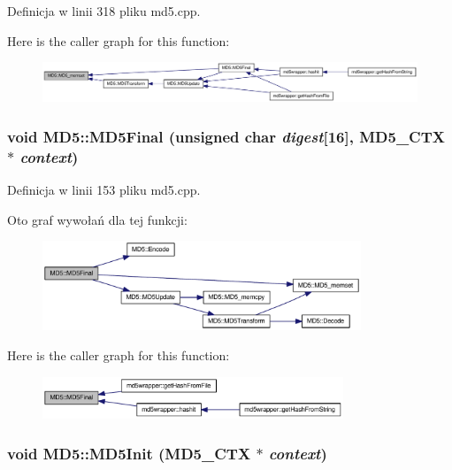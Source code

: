 Definicja w linii 318 pliku md5.cpp.

Here is the caller graph for this function:\nopagebreak
\begin{figure}[H]
\begin{center}
\leavevmode
\includegraphics[width=420pt]{d7/d46/a00002_e1a522aab83da49d1bd3f0a6f3edcd11_icgraph}
\end{center}
\end{figure}
\hypertarget{a00002_98039031d87c1f5b787050e2b487d83f}{
\subsubsection[{MD5Final}]{\setlength{\rightskip}{0pt plus 5cm}void MD5::MD5Final (unsigned char {\em digest}\mbox{[}16\mbox{]}, \/  {\bf MD5\_\-CTX} $\ast$ {\em context})}}
\label{d7/d46/a00002_98039031d87c1f5b787050e2b487d83f}




Definicja w linii 153 pliku md5.cpp.

Oto graf wywołań dla tej funkcji:\nopagebreak
\begin{figure}[H]
\begin{center}
\leavevmode
\includegraphics[width=270pt]{d7/d46/a00002_98039031d87c1f5b787050e2b487d83f_cgraph}
\end{center}
\end{figure}


Here is the caller graph for this function:\nopagebreak
\begin{figure}[H]
\begin{center}
\leavevmode
\includegraphics[width=255pt]{d7/d46/a00002_98039031d87c1f5b787050e2b487d83f_icgraph}
\end{center}
\end{figure}
\hypertarget{a00002_72b35c041cb6983aaa74e2f1c31d5a29}{
\subsubsection[{MD5Init}]{\setlength{\rightskip}{0pt plus 5cm}void MD5::MD5Init ({\bf MD5\_\-CTX} $\ast$ {\em context})}}
\label{d7/d46/a00002_72b35c041cb6983aaa74e2f1c31d5a29}




